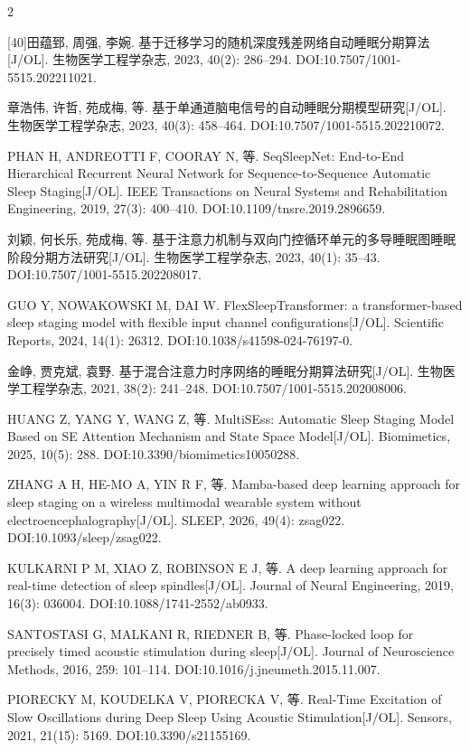 \documentclass[UTF8,zihao=5,fontset=none]{ctexart}
\begin{document}
\begin{multicols}{2}
{[40]\quad 田蕴郅, 周强, 李婉. 基于迁移学习的随机深度残差网络自动睡眠分期算法[J/OL]. 生物医学工程学杂志, 2023, 40(2): 286--294. DOI:10.7507/1001-5515.202211021.\par
[41]\quad 章浩伟, 许哲, 苑成梅, 等. 基于单通道脑电信号的自动睡眠分期模型研究[J/OL]. 生物医学工程学杂志, 2023, 40(3): 458--464. DOI:10.7507/1001-5515.202210072.\par
[42]\quad PHAN H, ANDREOTTI F, COORAY N, 等. SeqSleepNet: End-to-End Hierarchical Recurrent Neural Network for Sequence-to-Sequence Automatic Sleep Staging[J/OL]. IEEE Transactions on Neural Systems and Rehabilitation Engineering, 2019, 27(3): 400--410. DOI:10.1109/tnsre.2019.2896659.\par
[43]\quad 刘颖, 何长乐, 苑成梅, 等. 基于注意力机制与双向门控循环单元的多导睡眠图睡眠阶段分期方法研究[J/OL]. 生物医学工程学杂志, 2023, 40(1): 35--43. DOI:10.7507/1001-5515.202208017.\par
[44]\quad GUO Y, NOWAKOWSKI M, DAI W. FlexSleepTransformer: a transformer-based sleep staging model with flexible input channel configurations[J/OL]. Scientific Reports, 2024, 14(1): 26312. DOI:10.1038/s41598-024-76197-0.\par
[45]\quad 金峥, 贾克斌, 袁野. 基于混合注意力时序网络的睡眠分期算法研究[J/OL]. 生物医学工程学杂志, 2021, 38(2): 241--248. DOI:10.7507/1001-5515.202008006.\par
[46]\quad HUANG Z, YANG Y, WANG Z, 等. MultiSEss: Automatic Sleep Staging Model Based on SE Attention Mechanism and State Space Model[J/OL]. Biomimetics, 2025, 10(5): 288. DOI:10.3390/biomimetics10050288.\par
[47]\quad ZHANG A H, HE-MO A, YIN R F, 等. Mamba-based deep learning approach for sleep staging on a wireless multimodal wearable system without electroencephalography[J/OL]. SLEEP, 2026, 49(4): zsag022. DOI:10.1093/sleep/zsag022.\par
[48]\quad KULKARNI P M, XIAO Z, ROBINSON E J, 等. A deep learning approach for real-time detection of sleep spindles[J/OL]. Journal of Neural Engineering, 2019, 16(3): 036004. DOI:10.1088/1741-2552/ab0933.\par
[49]\quad SANTOSTASI G, MALKANI R, RIEDNER B, 等. Phase-locked loop for precisely timed acoustic stimulation during sleep[J/OL]. Journal of Neuroscience Methods, 2016, 259: 101--114. DOI:10.1016/j.jneumeth.2015.11.007.\par
[50]\quad PIORECKY M, KOUDELKA V, PIORECKA V, 等. Real-Time Excitation of Slow Oscillations during Deep Sleep Using Acoustic Stimulation[J/OL]. Sensors, 2021, 21(15): 5169. DOI:10.3390/s21155169.\par
}
\end{multicols}
\end{document}
